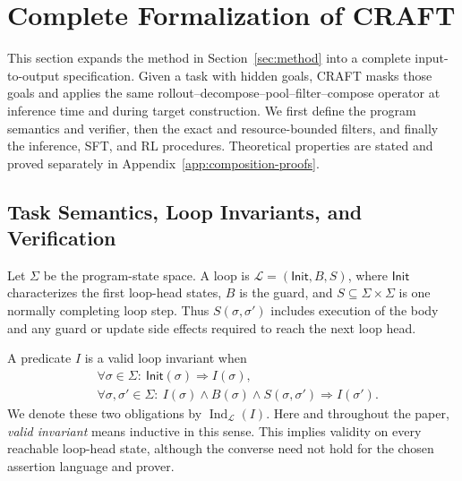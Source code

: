 \section{Complete Formalization of CRAFT}
\label{app:formal-method}

This section expands the method in Section~\ref{sec:method} into a complete
input-to-output specification.  Given a task with hidden goals, CRAFT masks
those goals and applies the same rollout--decompose--pool--filter--compose
operator at inference time and during target construction.  We first define
the program semantics and verifier, then the exact and resource-bounded
filters, and finally the inference, SFT, and RL procedures.  Theoretical
properties are stated and proved separately in
Appendix~\ref{app:composition-proofs}.

\subsection{Task Semantics, Loop Invariants, and Verification}
\label{app:formal-loop-verification}

Let \(\Sigma\) be the program-state space.  A loop is
\(\mathcal L=(\mathsf{Init},B,S)\), where \(\mathsf{Init}\) characterizes the
first loop-head states, \(B\) is the guard, and
\(S\subseteq\Sigma\times\Sigma\) is one normally completing loop step.  Thus
\(S(\sigma,\sigma')\) includes execution of the body and any guard or update
side effects required to reach the next loop head.

\begin{definition}
\label{def:formal-inductive}
A predicate \(I\) is a valid loop invariant when
\begin{equation}
  \begin{split}
  &\forall\sigma\in\Sigma:\
    \mathsf{Init}(\sigma)\Rightarrow I(\sigma),\\
  &\forall\sigma,\sigma'\in\Sigma:\
    I(\sigma)\land B(\sigma)\land S(\sigma,\sigma')
    \Rightarrow I(\sigma').
  \end{split}
  \label{eq:formal-inductive}
\end{equation}
We denote these two obligations by \(\operatorname{Ind}_{\mathcal L}(I)\).
Here and throughout the paper, \emph{valid invariant} means inductive in this
sense.  This implies validity on every reachable loop-head state, although the
converse need not hold for the chosen assertion language and prover.
\end{definition}

